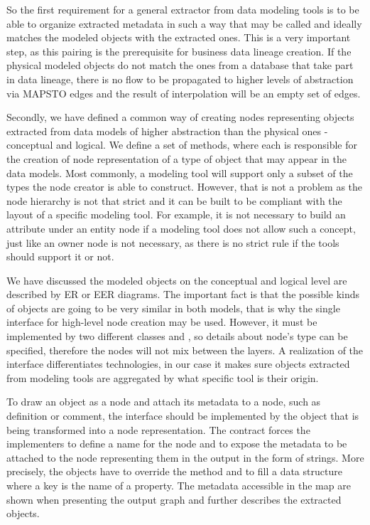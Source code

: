 So the first requirement for a general extractor from data modeling tools is to be able to organize extracted metadata in such a way that  may be called and ideally matches the modeled objects with the extracted ones.
This is a very important step, as this pairing is the prerequisite for business data lineage creation. If the physical modeled objects do not match the ones from a database that take part in data lineage, there is no flow to be propagated to higher levels of abstraction via MAPS\textunderscore TO edges and the result of interpolation will be an empty set of edges.

Secondly, we have defined a common way of creating nodes representing objects extracted from data models of higher abstraction than the physical ones - conceptual and logical.
We define a set of methods, where each is responsible for the creation of node representation of a type of object that may appear in the data models. Most commonly, a modeling tool will support only a subset of the types the node creator is able to construct. 
However, that is not a problem as the node hierarchy is not that strict and it can be built to be compliant with the layout of a specific modeling tool. 
For example, it is not necessary to build an attribute under an entity node if a modeling tool does not allow such a concept, just like an owner node is not necessary, as there is no strict rule if the tools should support it or not.

We have discussed the modeled objects on the conceptual and logical level are described by ER or EER diagrams. 
The important fact is that the possible kinds of objects are going to be very similar in both models, that is why the single interface  for high-level node creation may be used.
However, it must be implemented by two different classes  and , so details about node's type can be specified, therefore the nodes will not mix between the layers.
A realization of the  interface differentiates technologies, in our case it makes sure objects extracted from modeling tools are aggregated by what specific tool is their origin.

To draw an object as a node and attach its metadata to a node, such as definition or comment, the  interface should be implemented by the object that is being transformed into a node representation.
The contract forces the implementers to define a name for the node and to expose the metadata to be attached to the node representing them in the output in the form of strings. 
More precisely, the objects have to override the  method and to fill a  data structure where a key is the name of a property. 
The metadata accessible in the map are shown when presenting the output graph and further describes the extracted objects. \\ 

